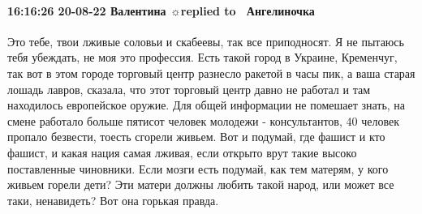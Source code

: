  
 
 
 
 

\paragraph{16:16:26 20-08-22 Валентина ☼replied to 🧚‍♀️Ангелиночка}


Это тебе, твои лживые соловьи и скабеевы, так все приподносят. Я не пытаюсь
тебя убеждать, не моя это профессия. Есть такой город в Украине, Кременчуг, так
вот в этом городе торговый центр разнесло ракетой в часы пик, а ваша старая
лошадь лавров, сказала, что этот торговый центр давно не работал и там
находилось европейское оружие. Для общей информации не помешает знать, на смене
работало больше пятисот человек молодежи - консультантов, 40 человек пропало
безвести, тоесть сгорели живьем. Вот и подумай, где фашист и кто фашист, и
какая нация самая лживая, если открыто врут такие высоко поставленные
чиновники. Если мозги есть подумай, как тем матерям, у кого живьем горели дети?
Эти матери должны любить такой народ, или может все таки, ненавидеть? Вот она
горькая правда.
